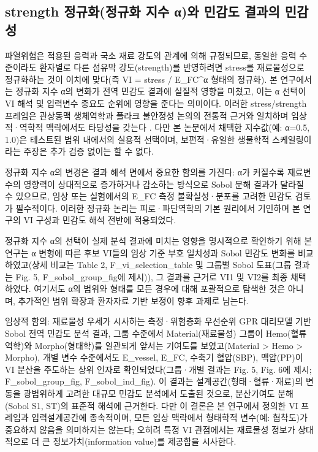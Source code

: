 \documentclass[preprint,12pt]{elsarticle}
\begin{document}
\subsection{strength 정규화(정규화 지수 α)와 민감도 결과의 민감성}
파열위험은 적용된 응력과 국소 재료 강도의 관계에 의해 규정되므로, 동일한 응력 수준이라도 환자별로 다른 섬유막 강도(strength)를 반영하려면 stress를 재료물성으로 정규화하는 것이 이치에 맞다(즉 VI = stress / E\_FC\textasciicircum α 형태의 정규화). 본 연구에서는 정규화 지수 α의 변화가 전역 민감도 결과에 실질적 영향을 미쳤고, 이는 α 선택이 VI 해석 및 입력변수 중요도 순위에 영향을 준다는 의미이다. 이러한 stress/strength 프레임은 관상동맥 생체역학과 플라크 불안정성 논의의 전통적 근거와 일치하며 임상적·역학적 맥락에서도 타당성을 갖는다 \cite{brown2016} \cite{choi2015} \cite{stefanadis2017}. 다만 본 논문에서 채택한 지수값(예: α=0.5, 1.0)은 테스트된 범위 내에서의 실용적 선택이며, 보편적·유일한 생물학적 스케일링이라는 주장은 추가 검증 없이는 할 수 없다.

정규화 지수 α의 변경은 결과 해석 면에서 중요한 함의를 가진다: α가 커질수록 재료변수의 영향력이 상대적으로 증가하거나 감소하는 방식으로 Sobol 분해 결과가 달라질 수 있으므로, 임상 또는 실험에서의 E\_FC 측정 불확실성·분포를 고려한 민감도 검토가 필수적이다. 이러한 정규화 논리는 피로·파단역학의 기본 원리에서 기인하며 본 연구의 VI 구성과 민감도 해석 전반에 적용되었다.

정규화 지수 α의 선택이 실제 분석 결과에 미치는 영향을 명시적으로 확인하기 위해 본 연구는 α 변형에 따른 후보 VI들의 임상 기준 부호 일치성과 Sobol 민감도 변화를 비교하였고(상세 비교는 Table 2, F\_vi\_selection\_table 및 그룹별 Sobol 도표(그룹 결과는 Fig. 5, F\_sobol\_group\_fig에 제시)), 그 결과를 근거로 VI1 및 VI2를 최종 채택하였다. 여기서도 α의 범위와 형태를 모든 경우에 대해 포괄적으로 탐색한 것은 아니며, 추가적인 범위 확장과 환자자료 기반 보정이 향후 과제로 남는다.

임상적 함의: 재료물성 우세가 시사하는 측정·위험층화 우선순위
GPR 대리모델 기반 Sobol 전역 민감도 분석 결과, 그룹 수준에서 Material(재료물성) 그룹이 Hemo(혈류역학)와 Morpho(형태학)를 일관되게 앞서는 기여도를 보였고(Material > Hemo > Morpho), 개별 변수 수준에서도 E\_vessel, E\_FC, 수축기 혈압(SBP), 맥압(PP)이 VI 분산을 주도하는 상위 인자로 확인되었다(그룹·개별 결과는 Fig. 5, Fig. 6에 제시; F\_sobol\_group\_fig, F\_sobol\_ind\_fig). 이 결과는 설계공간(형태·혈류·재료)의 변동을 광범위하게 고려한 대규모 민감도 분석에서 도출된 것으로, 분산기여도 분해(Sobol S1, ST)의 표준적 해석에 근거한다. 다만 이 결론은 본 연구에서 정의한 VI 프레임과 입력설계공간에 종속적이며, 모든 임상 맥락에서 형태학적 변수(예: 협착도)가 중요하지 않음을 의미하지는 않는다; 오히려 특정 VI 관점에서는 재료물성 정보가 상대적으로 더 큰 정보가치(information value)를 제공함을 시사한다.
\end{document}
